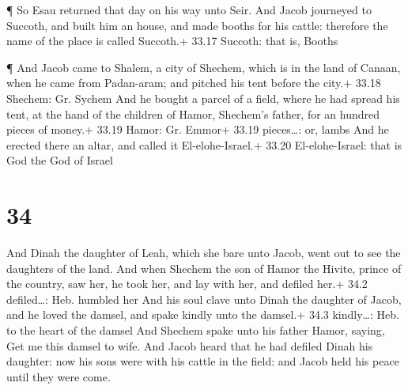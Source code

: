  ¶ So Esau returned that day on his way unto Seir.
 And Jacob journeyed to Succoth, and built him an house,
and made booths for his cattle: therefore the name of the place is
called Succoth.+ 33.17 Succoth: that is, Booths

 ¶ And Jacob came to Shalem, a city of Shechem, which is in
the land of Canaan, when he came from Padan-aram; and pitched his tent
before the city.+ 33.18 Shechem: Gr. Sychem  And he bought
a parcel of a field, where he had spread his tent, at the hand of the
children of Hamor, Shechem's father, for an hundred pieces of money.+
33.19 Hamor: Gr. Emmor+ 33.19 pieces\ldots: or, lambs  And
he erected there an altar, and called it El-elohe-Israel.+ 33.20
El-elohe-Israel: that is God the God of Israel

\hypertarget{section-33}{%
\section{34}\label{section-33}}

 And Dinah the daughter of Leah, which she bare unto Jacob,
went out to see the daughters of the land.  And when Shechem
the son of Hamor the Hivite, prince of the country, saw her, he took
her, and lay with her, and defiled her.+ 34.2 defiled\ldots: Heb.
humbled her  And his soul clave unto Dinah the daughter of
Jacob, and he loved the damsel, and spake kindly unto the damsel.+ 34.3
kindly\ldots: Heb. to the heart of the damsel  And Shechem
spake unto his father Hamor, saying, Get me this damsel to wife.
 And Jacob heard that he had defiled Dinah his daughter: now
his sons were with his cattle in the field: and Jacob held his peace
until they were come.

